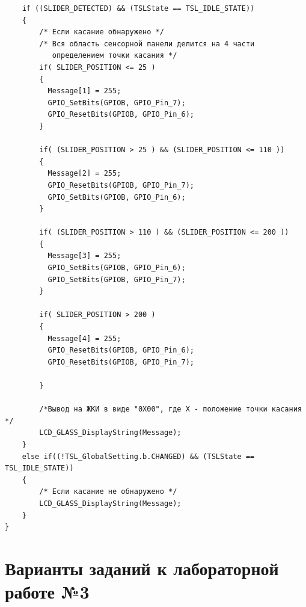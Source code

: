 \begin{verbatim}
    if ((SLIDER_DETECTED) && (TSLState == TSL_IDLE_STATE))
    {
        /* Если касание обнаружено */
        /* Вся область сенсорной панели делится на 4 части 
           определением точки касания */  
        if( SLIDER_POSITION <= 25 )
        {
          Message[1] = 255;       
          GPIO_SetBits(GPIOB, GPIO_Pin_7);
          GPIO_ResetBits(GPIOB, GPIO_Pin_6);
        }
        
        if( (SLIDER_POSITION > 25 ) && (SLIDER_POSITION <= 110 )) 
        {       
          Message[2] = 255; 
          GPIO_ResetBits(GPIOB, GPIO_Pin_7);
          GPIO_SetBits(GPIOB, GPIO_Pin_6);  
        }
        
        if( (SLIDER_POSITION > 110 ) && (SLIDER_POSITION <= 200 )) 
        {      
          Message[3] = 255;  
          GPIO_SetBits(GPIOB, GPIO_Pin_6);
          GPIO_SetBits(GPIOB, GPIO_Pin_7); 
        }
        
        if( SLIDER_POSITION > 200 )
        {    
          Message[4] = 255;
          GPIO_ResetBits(GPIOB, GPIO_Pin_6);
          GPIO_ResetBits(GPIOB, GPIO_Pin_7);

        }
          
        /*Вывод на ЖКИ в виде "0Х00", где Х - положение точки касания */   
        LCD_GLASS_DisplayString(Message);
    } 
    else if((!TSL_GlobalSetting.b.CHANGED) && (TSLState == TSL_IDLE_STATE))
    {     
        /* Если касание не обнаружено */
        LCD_GLASS_DisplayString(Message);
    }
}
\end{verbatim}


\section{Варианты заданий к лабораторной работе №3} \label{variants}

